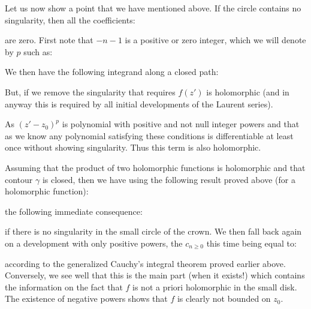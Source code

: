 	Let us now show a point that we have mentioned above. If the circle contains no singularity, then all the coefficients:
	
	are zero. First note that $-n-1$ is a positive or zero integer, which we will denote by $p$ such as:
	
	We then have the following integrand along a closed path:
	
	But, if we remove the singularity that requires $f(z')$ is holomorphic (and in anyway this is required by all initial developments of the Laurent series).
	
	As $(z'-z_0)^p$ is polynomial with positive and not null integer powers and that as we know any polynomial satisfying these conditions is differentiable at least once without showing singularity. Thus this term is also holomorphic.
	
	Assuming that the product of two holomorphic functions is holomorphic and that contour $\gamma$ is closed, then we have using the following result proved above (for a holomorphic function):
	
	the following immediate consequence:
	
	if there is no singularity in the small circle of the crown. We then fall back again on a development with only positive powers, the $c_{n\geq 0}$ this time being equal to:
	
	according to the generalized Cauchy's integral theorem proved earlier above. Conversely, we see well that this is the main part (when it exists!) which contains the information on the fact that $f$ is not a priori holomorphic in the small disk. The existence of negative powers shows that $f$ is clearly not bounded on $z_0$.
	
